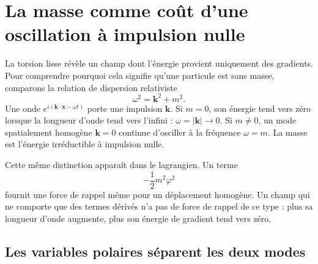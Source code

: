 \begin{classroomqa}
\end{classroomqa}

\section{La masse comme coût d’une oscillation à impulsion nulle}

La torsion lisse révèle un champ dont l’énergie provient uniquement des gradients. Pour comprendre pourquoi cela signifie qu’une particule est sans masse, comparons la relation de dispersion relativiste
\begin{equation}
  \omega^2=\bm{k}^2+m^2.
  \label{eq:l07-dispersion}
\end{equation}
Une onde \(e^{i(\bm{k}\cdot\bm{x}-\omega t)}\) porte une impulsion \(\bm{k}\). Si \(m=0\), son énergie tend vers zéro lorsque la longueur d’onde tend vers l’infini : \(\omega=|\bm{k}|\to0\). Si \(m\ne0\), un mode spatialement homogène \(\bm{k}=0\) continue d’osciller à la fréquence \(\omega=m\). La masse est l’énergie irréductible à impulsion nulle.

Cette même distinction apparaît dans le lagrangien. Un terme
\begin{equation}
  -\frac12m^2\varphi^2
\end{equation}
fournit une force de rappel même pour un déplacement homogène. Un champ qui ne comporte que des termes dérivés n’a pas de force de rappel de ce type : plus sa longueur d’onde augmente, plus son énergie de gradient tend vers zéro.

\subsection{Les variables polaires séparent les deux modes}


